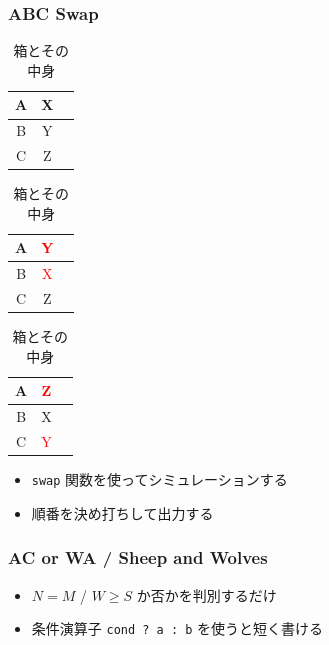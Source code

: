 \documentclass[t, aspectratio=169, dvipdfmx]{beamer}
\begin{document}
\begin{frame}[containsverbatim]
  \frametitle{ABC Swap}
  \begin{table}
    \caption{箱とその中身}
    \begin{minipage}{0.2\hsize}
      \begin{center}
        \begin{tabular}{|c|c|c|} \hline
          A & X \\ \hline
          B & Y \\ \hline
          C & Z \\ \hline
        \end{tabular}
      \end{center}
    \end{minipage}
    \begin{minipage}{0.2\hsize}
      \begin{center}
        \begin{tabular}{|c|c|c|} \hline
          A & \textcolor{red}{Y} \\ \hline
          B & \textcolor{red}{X} \\ \hline
          C & Z \\ \hline
        \end{tabular}
      \end{center}
    \end{minipage}
    \begin{minipage}{0.2\hsize}
      \begin{center}
        \begin{tabular}{|c|c|c|} \hline
          A & \textcolor{red}{Z} \\ \hline
          B & X \\ \hline
          C & \textcolor{red}{Y} \\ \hline
        \end{tabular}
      \end{center}
    \end{minipage}
  \end{table}
  \begin{itemize}
    \item \verb|swap| 関数を使ってシミュレーションする
    \item 順番を決め打ちして出力する
  \end{itemize}
\end{frame}

\begin{frame}[containsverbatim]
  \frametitle{AC or WA / Sheep and Wolves}
  \begin{itemize}
    \item $N=M$ / $W \geq S$ か否かを判別するだけ
    \item 条件演算子 \verb|cond ? a : b| を使うと短く書ける
  \end{itemize}
\end{frame}
\end{document}
